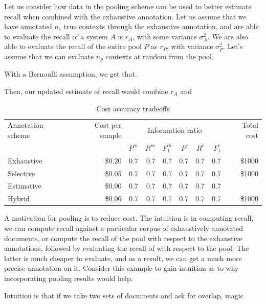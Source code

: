 Let us consider how data in the pooling scheme can be used to better estimate recall when combined with the exhaustive annotation.
Let us assume that we have annotated $n_e$ true contexts through the exhaustive annotation, and are able to evaluate the recall of a system $A$ is $r_A$, with some variance $\sigma^2_A$.
We are also able to evaluate the recall of the entire pool $P$ as $r_P$, with variance $\sigma^2_P$.
Let's assume that we can evaluate $n_p$ contexts at random from the pool. 

With a Bernoulli assumption, we get that.

Then, our updated estimate of recall would combine $r_A$ and 


\begin{table}
  \begin{tabular}{l r r r r r r r r} \toprule
    Annotation scheme & Cost per sample & \multicolumn{6}{c}{Information ratio} & Total cost \\ 
                      &                      & $P^m$ & $R^m$ & $F_1^m$ & $P^e$ & $R^e$ & $F_1^e$ &  \\ \midrule
    Exhaustive & \$0.20 & 0.7 & 0.7 & 0.7 & 0.7 & 0.7 & 0.7 & \$1000 \\
    Selective  & \$0.05 & 0.7 & 0.7 & 0.7 & 0.7 & 0.7 & 0.7 & \$1000 \\
    Estimative & \$0.00 & 0.7 & 0.7 & 0.7 & 0.7 & 0.7 & 0.7 &  \\
    Hybrid     & \$0.06 & 0.7 & 0.7 & 0.7 & 0.7 & 0.7 & 0.7 & \$1000 \\ \bottomrule
  \end{tabular}
  \caption{Cost accuracy tradeoffs}
\end{table}

A motivation for pooling is to reduce cost.
The intuition is in computing recall, we can compute recall against a particular corpus of exhaustively annotated documents,
or compute the recall of the pool with respect to the exhaustive annotations, followed by evaluating the recall of with respect to the pool. 
The latter is much cheaper to evaluate, and as a result, we can get a much more precise annotation on it.
Consider this example to gain intuition as to why incorporating pooling results would help.

Intuition is that if we take two sets of documents and ask for overlap, magic 

